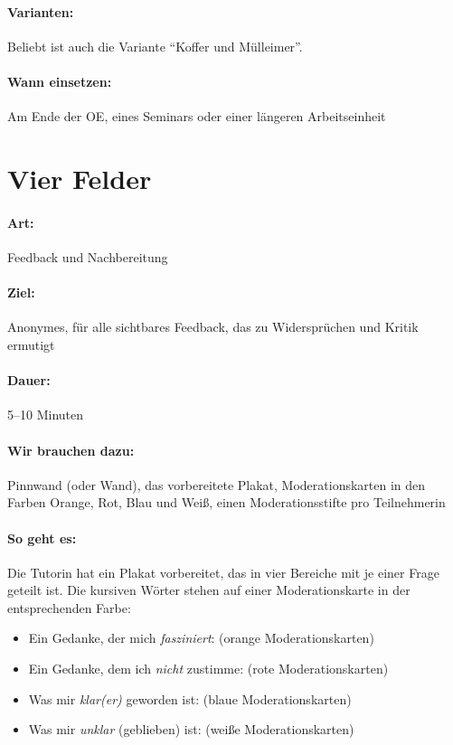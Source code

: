 \paragraph{Varianten:} Beliebt ist auch die Variante "`Koffer und Mülleimer"'.
\paragraph{Wann einsetzen:} Am Ende der OE, eines Seminars oder einer längeren Arbeitseinheit

\section{Vier Felder}
\paragraph{Art:} Feedback und Nachbereitung
\paragraph{Ziel:} Anonymes, für alle sichtbares Feedback, das zu Widersprüchen und Kritik ermutigt
\paragraph{Dauer:} 5--10 Minuten
\paragraph{Wir brauchen dazu:} Pinnwand (oder Wand), das vorbereitete Plakat, Moderationskarten in den Farben Orange, Rot, Blau und Weiß, einen Moderationsstifte pro Teilnehmerin
\paragraph{So geht es:} Die Tutorin hat ein Plakat vorbereitet, das in vier Bereiche mit je einer Frage geteilt ist. Die kursiven Wörter stehen auf einer Moderationskarte in der entsprechenden Farbe:
\begin{itemize}
\item Ein Gedanke, der mich \emph{fasziniert}: (orange Moderationskarten)
\item Ein Gedanke, dem ich \emph{nicht} zustimme: (rote Moderationskarten)
\item Was mir \emph{klar(er)} geworden ist: (blaue Moderationskarten)
\item Was mir \emph{unklar} (geblieben) ist: (weiße Moderationskarten)
\end{itemize}


